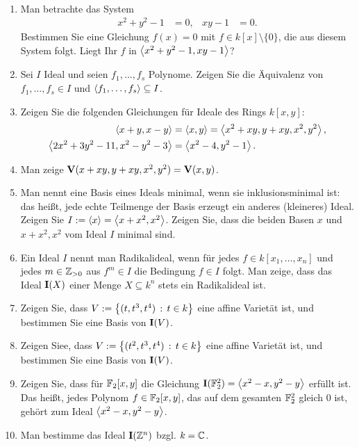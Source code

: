 \documentclass[11pt]{article}
\numberwithin{equation}{section}
\begin{document}
\begin{aufgaben}{\ } 
\begin{enumerate}
	\item Man betrachte das System 
	\begin{align*} 
			x^2 + y^2 - 1 & = 0,  & xy - 1 & = 0.
	\end{align*} 
	Bestimmen Sie eine Gleichung $f(x) = 0$ mit $f \in k[x] \setminus \{0\}$, die aus diesem System folgt. Liegt Ihr $f$ in $\left< x^2 + y^2 -1, xy -1 \right>$? 
	\item Sei $I$ Ideal und seien $f_1,\ldots,f_s$ Polynome. Zeigen Sie die Äquivalenz von $f_1,\ldots,f_s \in I$ und $\left< f_1,\ldots,f_s \right> \subseteq I$. 
	\item Zeigen Sie die folgenden Gleichungen für Ideale des Rings $k[x,y]$: 
	\begin{align*}
			\left< x+y,x-y \right> & = \left< x,y \right> = \left< x^2 + xy, y + xy, x^2, y^2 \right>,
			 \\ \left< 2 x^2 + 3 y^2 - 11, x^2 - y^2 -3 \right> & = \left< x^2 -4, y^2 - 1 \right>. 
	\end{align*}
	\item Man zeige $\mathbf{V}(x + xy, y + xy, x^2, y^2) = \mathbf{V}(x,y)$. 
	\item Man nennt eine Basis eines Ideals minimal, wenn sie inklusionsminimal ist: das heißt, jede echte Teilmenge der Basis erzeugt ein anderes (kleineres) Ideal. Zeigen Sie $I:=\left< x \right> = \left< x + x^2, x^2 \right>$. Zeigen Sie, dass die beiden Basen $x$ und $x+x^2,x^2$ vom Ideal $I$ minimal sind. 
	\item Ein Ideal $I$ nennt man Radikalideal, wenn für jedes $f \in k[x_1,\ldots,x_n]$ und jedes $m \in \mathbb{Z}_{>0}$ aus $f^m \in I$ die Bedingung $f \in I$ folgt. Man zeige, dass das Ideal $\mathbf{I}(X)$ einer Menge $X \subseteq k^n$ stets ein Radikalideal ist. 
	\item Zeigen Sie, dass $V:=\left\{ (t,t^3,t^4) \,:\, t \in k \right\}$ eine affine Varietät ist, und bestimmen Sie eine Basis von $\mathbf{I}(V)$. 
	\item Zeigen Siee, dass $V:= \left\{ (t^2,t^3,t^4) \,:\, t \in k \right\}$ eine affine Varietät ist, und bestimmen Sie eine Basis von $\mathbf{I}(V)$. 
	\item Zeigen Sie, dass für $\mathbb{F}_2[x,y]$ die Gleichung $\mathbf{I}(\mathbb{F}_2^2) = \left< x^2 -x,y^2 -y \right>$ erfüllt ist. Das heißt, jedes Polynom $f \in \mathbb{F}_2[x,y]$, das auf dem gesamten $\mathbb{F}_2^2$ gleich $0$ ist, gehört zum Ideal $\left< x^2-x,y^2 -y \right>$. 
	\item Man bestimme das Ideal $\mathbf{I}(\mathbb{Z}^n)$ bzgl. $k= \mathbb{C}$. 
\end{enumerate}
\end{aufgaben}
\end{document}
